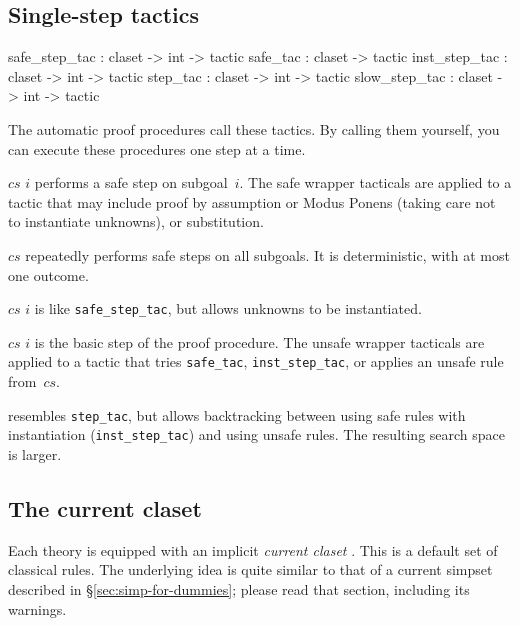 \subsection{Single-step tactics}
\begin{ttbox} 
safe_step_tac : claset -> int -> tactic
safe_tac      : claset        -> tactic
inst_step_tac : claset -> int -> tactic
step_tac      : claset -> int -> tactic
slow_step_tac : claset -> int -> tactic
\end{ttbox}
The automatic proof procedures call these tactics.  By calling them
yourself, you can execute these procedures one step at a time.
\begin{ttdescription}
\item[\ttindexbold{safe_step_tac} $cs$ $i$] performs a safe step on
  subgoal~$i$.  The safe wrapper tacticals are applied to a tactic that may
  include proof by assumption or Modus Ponens (taking care not to instantiate
  unknowns), or substitution.

\item[\ttindexbold{safe_tac} $cs$] repeatedly performs safe steps on all 
subgoals.  It is deterministic, with at most one outcome.  

\item[\ttindexbold{inst_step_tac} $cs$ $i$] is like \texttt{safe_step_tac},
but allows unknowns to be instantiated.

\item[\ttindexbold{step_tac} $cs$ $i$] is the basic step of the proof
  procedure.  The unsafe wrapper tacticals are applied to a tactic that tries
  \texttt{safe_tac}, \texttt{inst_step_tac}, or applies an unsafe rule
  from~$cs$.

\item[\ttindexbold{slow_step_tac}] 
  resembles \texttt{step_tac}, but allows backtracking between using safe
  rules with instantiation (\texttt{inst_step_tac}) and using unsafe rules.
  The resulting search space is larger.
\end{ttdescription}


\subsection{The current claset}\label{sec:current-claset}

Each theory is equipped with an implicit \emph{current claset}
.  This is a default set of classical
rules.  The underlying idea is quite similar to that of a current
simpset described in \S\ref{sec:simp-for-dummies}; please read that
section, including its warnings.  

